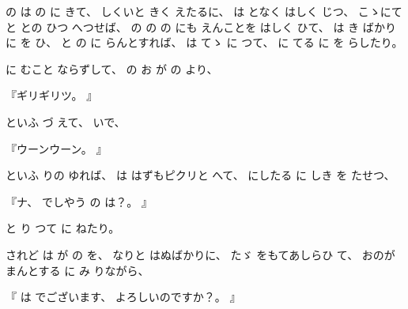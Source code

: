
%
の
は
の
に
きて、
%
しくいと
きく
えたるに、
%
は
となく
はしく
じつ、
%
こゝにて
と
との
ひつ
へつせば、
%
の
の
の
にも
えんことを
はしく
ひて、
%
は
き
ばかりに
を
ひ、
%
と
の
に
らんとすれば、
%
は
てゝ
に
つて、
%
に
てる
に
を
らしたり。

%
に
むこと
ならずして、
%
の
お
が
の
より、

%
『ギリギリツ。
』

%
といふ
づ
えて、
%
いで、

%
『ウーンウーン。
』

%
といふ
りの
ゆれば、
%
は
はずもピクリと
へて、
%
にしたる
に
しき
を
たせつ、

%
『ナ、
%
でしやう
の
は？。
』

%
と
り
つて
に
ねたり。

%
されど
は
が
の
を、
%
なりと
はぬばかりに、
%
たゞ
をもてあしらひ
て、
%
おのが
まんとする
に
み
りながら、

%
『
は%
でございます、
%
よろしいのですか？。
』

